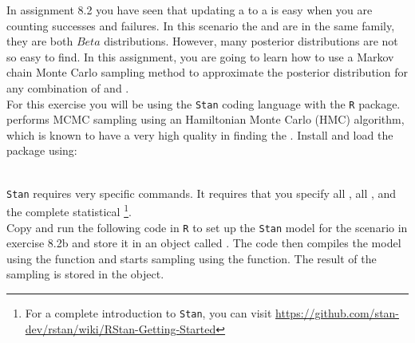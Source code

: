 \setcounter{section}{8}
\setcounter{subsection}{3}
\setcounter{question}{0}



In assignment 8.2 you have seen that updating a  to a  is easy when you are counting successes and failures. In this scenario the  and  are in the same family, they are both $Beta$ distributions. However, many posterior distributions are not so easy to find. In this assignment, you are going to learn how to use a Markov chain Monte Carlo sampling method to approximate the posterior distribution for any combination of  and . \\

For this exercise you will be using the \texttt{Stan} coding language with the  \texttt{R} package.  performs MCMC sampling using an Hamiltonian Monte Carlo (HMC) algorithm, which is known to have a very high quality in finding the . Install and load the package using: \\
\\

\texttt{Stan} requires very specific commands. It requires that you specify all , all , and the complete statistical \footnote{For a complete introduction to \texttt{Stan}, you can visit \url{https://github.com/stan-dev/rstan/wiki/RStan-Getting-Started}}. \\

Copy and run the following code in \texttt{R} to set up the \texttt{Stan} model for the scenario in exercise 8.2b and store it in an object called . The code then compiles the model using the  function and starts sampling using the  function. The result of the sampling is stored in the  object. \\



